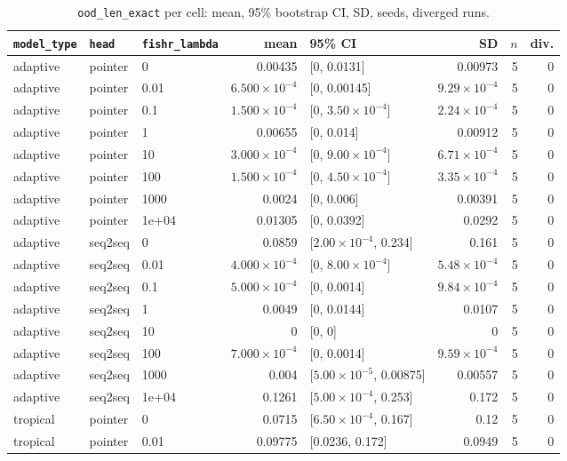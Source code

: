 \documentclass[10pt]{article}
\begin{document}
{\small
\begin{longtable}{lllrlrrr}
\caption{\texttt{ood\_len\_exact} per cell: mean, 95\% bootstrap CI, SD, seeds, diverged runs.}\label{tab:summary-ood_len_exact}\\
\toprule
\texttt{model\_type} & \texttt{head} & \texttt{fishr\_lambda} & mean & 95\% CI & SD & $n$ & div.\\
\midrule
\endhead
adaptive & pointer & 0 & 0.00435 & [0, 0.0131] & 0.00973 & 5 & 0\\
adaptive & pointer & 0.01 & $6.500\times10^{-4}$ & [0, 0.00145] & $9.29\times10^{-4}$ & 5 & 0\\
adaptive & pointer & 0.1 & $1.500\times10^{-4}$ & [0, $3.50\times10^{-4}$] & $2.24\times10^{-4}$ & 5 & 0\\
adaptive & pointer & 1 & 0.00655 & [0, 0.014] & 0.00912 & 5 & 0\\
adaptive & pointer & 10 & $3.000\times10^{-4}$ & [0, $9.00\times10^{-4}$] & $6.71\times10^{-4}$ & 5 & 0\\
adaptive & pointer & 100 & $1.500\times10^{-4}$ & [0, $4.50\times10^{-4}$] & $3.35\times10^{-4}$ & 5 & 0\\
adaptive & pointer & 1000 & 0.0024 & [0, 0.006] & 0.00391 & 5 & 0\\
adaptive & pointer & 1e+04 & 0.01305 & [0, 0.0392] & 0.0292 & 5 & 0\\
adaptive & seq2seq & 0 & 0.0859 & [$2.00\times10^{-4}$, 0.234] & 0.161 & 5 & 0\\
adaptive & seq2seq & 0.01 & $4.000\times10^{-4}$ & [0, $8.00\times10^{-4}$] & $5.48\times10^{-4}$ & 5 & 0\\
adaptive & seq2seq & 0.1 & $5.000\times10^{-4}$ & [0, 0.0014] & $9.84\times10^{-4}$ & 5 & 0\\
adaptive & seq2seq & 1 & 0.0049 & [0, 0.0144] & 0.0107 & 5 & 0\\
adaptive & seq2seq & 10 & 0 & [0, 0] & 0 & 5 & 0\\
adaptive & seq2seq & 100 & $7.000\times10^{-4}$ & [0, 0.0014] & $9.59\times10^{-4}$ & 5 & 0\\
adaptive & seq2seq & 1000 & 0.004 & [$5.00\times10^{-5}$, 0.00875] & 0.00557 & 5 & 0\\
adaptive & seq2seq & 1e+04 & 0.1261 & [$5.00\times10^{-4}$, 0.253] & 0.172 & 5 & 0\\
tropical & pointer & 0 & 0.0715 & [$6.50\times10^{-4}$, 0.167] & 0.12 & 5 & 0\\
tropical & pointer & 0.01 & 0.09775 & [0.0236, 0.172] & 0.0949 & 5 & 0\\

\end{longtable}}
\end{document}
